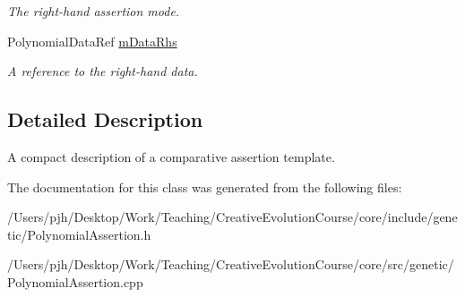 \begin{DoxyCompactItemize}
\begin{DoxyCompactList}\small\item\em The right-\/hand assertion mode. \end{DoxyCompactList}\item 
\hypertarget{class_assertion_aa09253adce817c0261d3f7917b84466c}{Polynomial\-Data\-Ref \hyperlink{class_assertion_aa09253adce817c0261d3f7917b84466c}{m\-Data\-Rhs}}\label{class_assertion_aa09253adce817c0261d3f7917b84466c}

\begin{DoxyCompactList}\small\item\em A reference to the right-\/hand data. \end{DoxyCompactList}\end{DoxyCompactItemize}


\subsection{Detailed Description}
A compact description of a comparative assertion template. 

The documentation for this class was generated from the following files\-:\begin{DoxyCompactItemize}
\item 
/\-Users/pjh/\-Desktop/\-Work/\-Teaching/\-Creative\-Evolution\-Course/core/include/genetic/Polynomial\-Assertion.\-h\item 
/\-Users/pjh/\-Desktop/\-Work/\-Teaching/\-Creative\-Evolution\-Course/core/src/genetic/Polynomial\-Assertion.\-cpp\end{DoxyCompactItemize}
